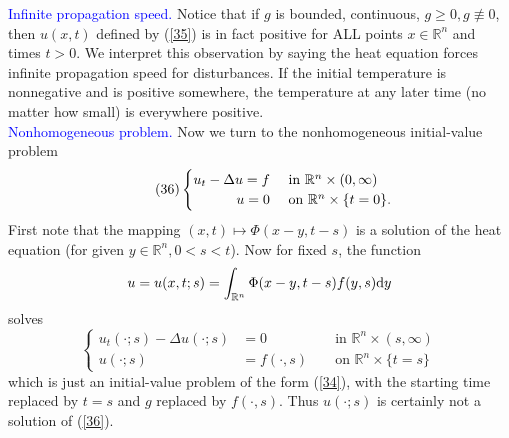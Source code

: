 \documentclass[hyperref,UTF8,12pt]{article}
\numberwithin{equation}{subsection}
\theoremstyle{plain}
\theoremstyle{definition}
\numberwithin{theorem}{section}
\numberwithin{lemma}{section}
\numberwithin{proposition}{section}
\numberwithin{remark}{section}
\numberwithin{corollary}{section}
\numberwithin{definition}{section}
\numberwithin{problem}{section}
\numberwithin{example}{section}
\def\dif{\textup{d}}
\newcommand{\mr}{\mathbb{R}}
\renewcommand{\geq}{\geqslant}
\begin{document}
\noindent\textcolor{blue}{Infinite propagation speed.} Notice that if $g$ is bounded, continuous, $g\geq0,g\not\equiv0$, then $u(x,t)$ defined by (\ref{35}) is in fact positive for ALL points $x\in\mr^n$ and times $t>0$. We interpret this observation by saying the heat equation forces infinite propagation speed for disturbances. If the initial temperature is nonnegative and is positive somewhere, the temperature at any later time (no matter how small) is everywhere positive.\\[4pt]
\noindent\textcolor{blue}{Nonhomogeneous problem.} Now we turn to the nonhomogeneous initial-value problem\[\tag{36}\label{36}\begin{cases}
	\hfill u_t-\Delta u=f & \text{ in } \mr^n\times(0,\infty)\\
	\hfill u=0&\text{ on } \mr^n\times\{t=0\}.
\end{cases}\]First note that the mapping $(x,t)\mapsto\Phi(x-y, t-s)$ is a solution of the heat equation (for given $y\in\mr^n,0<s<t$). Now for fixed $s$, the function
\[u=u(x,t;s)=\int_{\mr^n}\Phi(x-y,t-s)f(y,s)\dif y\]solves\[\left\{\begin{aligned}
	u_t(\cdot;s)-\Delta u(\cdot;s)&=0 & & \text{ in } \mr^n\times(s,\infty) \\
	u(\cdot;s)&=f(\cdot,s) & & \text{ on } \mr^n\times\{t=s\}
\end{aligned}\right.\tag{37}\label{37}\]which is just an initial-value problem of the form (\ref{34}), with the starting time replaced by $t=s$ and $g$ replaced by $f(\cdot,s)$. Thus $u(\cdot;s)$ is certainly not a solution of (\ref{36}).
\end{document}
